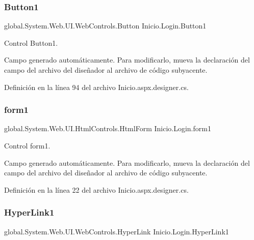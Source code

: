 \subsubsection{\texorpdfstring{Button1}{Button1}}
{\footnotesize\ttfamily global.\+System.\+Web.\+U\+I.\+Web\+Controls.\+Button Inicio.\+Login.\+Button1\hspace{0.3cm}{\ttfamily [protected]}}



Control Button1. 

Campo generado automáticamente. Para modificarlo, mueva la declaración del campo del archivo del diseñador al archivo de código subyacente. 

Definición en la línea 94 del archivo Inicio.\+aspx.\+designer.\+cs.

\mbox{\label{classInicio_1_1Login_a52e65c9e6119c96fb9e7efb178a72214}} 
\subsubsection{\texorpdfstring{form1}{form1}}
{\footnotesize\ttfamily global.\+System.\+Web.\+U\+I.\+Html\+Controls.\+Html\+Form Inicio.\+Login.\+form1\hspace{0.3cm}{\ttfamily [protected]}}



Control form1. 

Campo generado automáticamente. Para modificarlo, mueva la declaración del campo del archivo del diseñador al archivo de código subyacente. 

Definición en la línea 22 del archivo Inicio.\+aspx.\+designer.\+cs.

\mbox{\label{classInicio_1_1Login_a3370ab8441b3a73d003560dcbcaff0d9}} 
\subsubsection{\texorpdfstring{HyperLink1}{HyperLink1}}
{\footnotesize\ttfamily global.\+System.\+Web.\+U\+I.\+Web\+Controls.\+Hyper\+Link Inicio.\+Login.\+Hyper\+Link1\hspace{0.3cm}{\ttfamily [protected]}}



